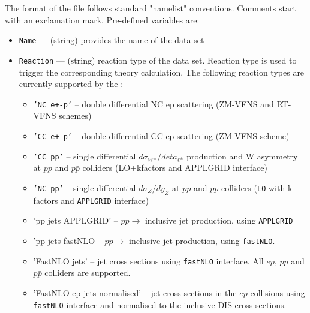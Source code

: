    The format of the file follows standard "namelist" conventions. Comments 
   start with an exclamation mark.  Pre-defined variables are:
\begin{itemize}
     \item{\tt Name}        --- (string) provides the name of the data set
    \item{\tt  Reaction}    --- (string) reaction type of the data set. Reaction type is used 
                      to trigger the corresponding theory calculation. The following 
                      reaction types  are currently supported by the \fitter:
                      \begin{itemize}
                        \item {\tt 'NC e+-p'}  -- double differential NC ep scattering
                                      (ZM-VFNS and RT-VFNS schemes) 
                        \item {\tt 'CC e+-p'}  -- double differential CC ep scattering
                                      (ZM-VFNS scheme)
                        \item {\tt 'CC pp'}    -- single differential $d \sigma_{W^{\pm}}/d eta_{\ell^{\pm}}$
                                      production and W asymmetry at $pp$ and $p\bar{p}$ 
                                      colliders (LO+kfactors and APPLGRID interface)
                        \item {\tt 'NC pp'}    -- single differential $d \sigma_Z / d y_Z$ at $pp$ and
                                      $p\bar{p}$ colliders
                                      ({\tt LO} with k-factors and {\tt APPLGRID} interface)

                        \item 'pp jets APPLGRID' -- $pp\to$ inclusive jet production, using
                                     {\tt APPLGRID}

                        \item 'pp jets fastNLO -- $pp\to$ inclusive jet production, using
                                     {\tt fastNLO}. 

                        \item 'FastNLO jets' -- jet cross sections using {\tt fastNLO} interface.
                                     All $ep$, $pp$ and $p\bar{p}$ colliders are supported.

                        \item 'FastNLO ep jets normalised' -- jet cross sections in the $ep$ collisions 
                                     using {\tt fastNLO} interface and normalised to the inclusive DIS cross sections.


\end{itemize}
\end{itemize}
